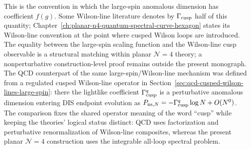 This is the convention in which the large-spin anomalous dimension has
coefficient \(f(g)\).  Some Wilson-line literature denotes by
\(\Gamma_{\rm cusp}\) half of this quantity; Chapter~\ref{ch:planar-n4-quantum-spectral-curve-hexagon}
states its Wilson-line convention at the point where cusped Wilson loops are
introduced.  The equality between the large-spin scaling function and the
Wilson-line cusp observable is a structural matching within planar
\(\mathcal N=4\) theory; a nonperturbative construction-level proof remains
outside the present monograph.  The QCD counterpart of the same
large-spin/Wilson-line mechanism was defined from a regulated cusped
Wilson-line operator in
Section~\ref{sec:qcd-cusped-wilson-lines-large-spin}: there the lightlike
coefficient \(\Gamma_{\rm cusp}^q\) is a perturbative anomalous dimension
entering DIS endpoint evolution as
\(P_{{\rm ns},N}=-\Gamma_{\rm cusp}^q\log N+O(N^0)\).  The comparison fixes the
shared operator meaning of the word ``cusp'' while keeping the theories'
logical status distinct: QCD uses factorization and perturbative
renormalization of Wilson-line composites, whereas the present planar
\(\mathcal N=4\) construction uses the integrable all-loop spectral problem.
